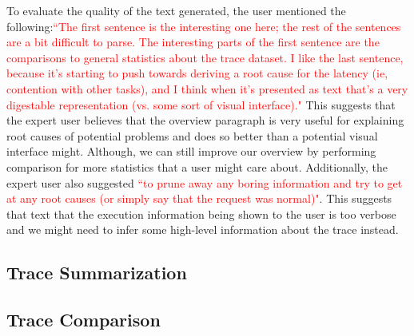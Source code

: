 To evaluate the quality of the text generated, the user mentioned the following:\textcolor{red}{``The first sentence is the interesting one here; the rest of the sentences are a bit difficult to parse.
The interesting parts of the first sentence are the comparisons to general statistics about the trace dataset.  I like the last sentence, because it's starting to push towards deriving a 
root cause for the latency (ie, contention with other tasks), and I think when it's presented as text that's a very digestable representation (vs. some sort of visual interface)."}
This suggests that the expert user believes that the overview paragraph is very useful for explaining root causes of potential problems and does so better than a potential
visual interface might. Although, we can still improve our overview by performing comparison for more statistics that a user might care about. Additionally,
the expert user also suggested \textcolor{red}{``to prune away any boring information and try to get at any root causes (or simply say that the request was normal)"}. This suggests
that text that the execution information being shown to the user is too verbose and we might need to infer some high-level information about the trace instead.

\subsection{Trace Summarization}

\subsection{Trace Comparison}